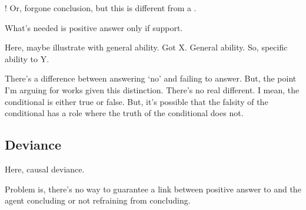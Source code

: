 \begin{note}
  \fc{}!
  Or, forgone conclusion, but this is different from a \fc{}.
\end{note}

\begin{note}
  What's needed is positive answer only if support.

  Here, maybe illustrate with general ability.
  Got X.
  General ability.
  So, specific ability to Y.
\end{note}

\begin{note}
  {
    \color{red}
    There's a difference between answering `no' and failing to answer.
    But, the point I'm arguing for works given this distinction.
    There's no real different.
    I mean, the conditional is either true or false.
    But, it's possible that the falsity of the conditional has a role where the truth of the conditional does not.
  }
\end{note}

\subsection{Deviance}
\label{sec:deviance}

\begin{note}
  Here, causal deviance.
\end{note}

\begin{note}
  Problem is, there's no way to guarantee a link between positive answer to \qzS{} and the agent concluding or not refraining from concluding.
\end{note}

